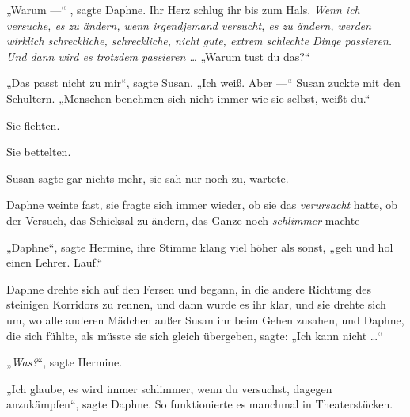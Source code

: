 „Warum —“ , sagte Daphne. Ihr Herz schlug ihr bis zum Hals. \emph{Wenn ich versuche, es zu ändern, wenn \emph{irgendjemand} versucht, es zu ändern, werden wirklich schreckliche, schreckliche, nicht gute, extrem schlechte Dinge passieren. Und dann wird es \emph{trotzdem} passieren …}
„Warum tust du das?“

„Das passt nicht zu mir“, sagte Susan.
„Ich weiß. Aber —“ Susan zuckte mit den Schultern.
„Menschen benehmen sich nicht immer wie sie selbst, weißt du.“

Sie flehten.

Sie bettelten.

Susan sagte gar nichts mehr, sie sah nur noch zu, wartete.

Daphne weinte fast, sie fragte sich immer wieder, ob sie das \emph{verursacht} hatte, ob der Versuch, das Schicksal zu ändern, das Ganze noch \emph{schlimmer} machte —

„Daphne“, sagte Hermine, ihre Stimme klang viel höher als sonst, „geh und hol einen Lehrer. Lauf.“

Daphne drehte sich auf den Fersen und begann, in die andere Richtung des steinigen Korridors zu rennen, und dann wurde es ihr klar, und sie drehte sich um, wo alle anderen Mädchen außer Susan ihr beim Gehen zusahen, und Daphne, die sich fühlte, als müsste sie sich gleich übergeben, sagte:
„Ich kann nicht …“

„\emph{Was?}“, sagte Hermine.

„Ich glaube, es wird immer schlimmer, wenn du versuchst, dagegen anzukämpfen“, sagte Daphne. So funktionierte es manchmal in Theaterstücken.

